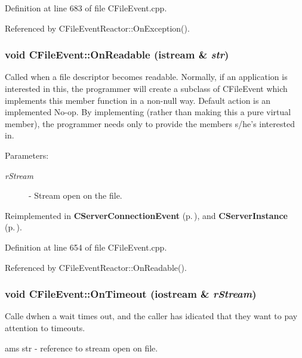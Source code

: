 Definition at line 683 of file CFile\-Event.cpp.

Referenced by CFile\-Event\-Reactor::On\-Exception().
\subsubsection{\setlength{\rightskip}{0pt plus 5cm}void CFile\-Event::On\-Readable (istream \& {\em str})\hspace{0.3cm}{\tt  [virtual]}}\label{classCFileEvent_a15}


Called when a file descriptor becomes readable. Normally, if an  application is interested in this, the programmer will create a subclass of CFile\-Event which implements this member function in a non-null way. Default action is an implemented No-op. By implementing (rather than making this a pure virtual member), the programmer needs only to provide the members s/he's interested in.\begin{Desc}
\item[Parameters: ]\par
\begin{description}
\item[{\em 
r\-Stream}]- Stream open on the file. \end{description}
\end{Desc}


Reimplemented in {\bf CServer\-Connection\-Event} {\rm (p.\,\pageref{classCServerConnectionEvent_a13})}, and {\bf CServer\-Instance} {\rm (p.\,\pageref{classCServerInstance_a8})}.

Definition at line 654 of file CFile\-Event.cpp.

Referenced by CFile\-Event\-Reactor::On\-Readable().
\subsubsection{\setlength{\rightskip}{0pt plus 5cm}void CFile\-Event::On\-Timeout (iostream \& {\em r\-Stream})\hspace{0.3cm}{\tt  [virtual]}}\label{classCFileEvent_a18}


Calle dwhen a wait times out, and the caller has idicated that they want to pay attention to timeouts. \begin{Desc}
\item[ams str - reference to stream open on file.]\par
\end{Desc}


